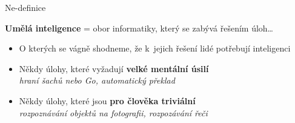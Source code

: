 \documentclass[aspectratio=169,dvipsnames]{beamer}
\begin{document}

\begin{frame}{Ne-definice}

    \begin{center}
        \Large
    \textbf{Umělá inteligence} = obor informatiky, který se zabývá řešením
    úloh\ldots
    \end{center}

    \vspace{10pt}

    \begin{itemize}

        \item<2-> O kterých se vágně shodneme, že k~jejich řešení lidé potřebují
            inteligenci

        \item<3-> Někdy úlohy, které vyžadují \textbf{velké mentální úsilí} \\
            \quad \emph{hraní šachů nebo Go, automatický překlad}

        \item<4-> Někdy úlohy, které jsou \textbf{pro člověka triviální} \\
            \quad \emph{rozpoznávání objektů na fotografii, rozpozávání řeči}

    \end{itemize}

    \centering\vspace{15pt}


\end{frame}

\end{document}
